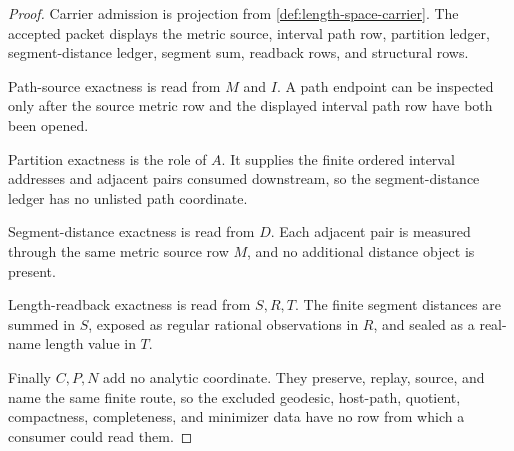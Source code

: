 \begin{proof}
Carrier admission is projection from \autoref{def:length-space-carrier}. The accepted packet displays the metric source, interval path row, partition ledger, segment-distance ledger, segment sum, readback rows, and structural rows.

Path-source exactness is read from $M$ and $I$. A path endpoint can be inspected only after the source metric row and the displayed interval path row have both been opened.

Partition exactness is the role of $A$. It supplies the finite ordered interval addresses and adjacent pairs consumed downstream, so the segment-distance ledger has no unlisted path coordinate.

Segment-distance exactness is read from $D$. Each adjacent pair is measured through the same metric source row $M$, and no additional distance object is present.

Length-readback exactness is read from $S,R,T$. The finite segment distances are summed in $S$, exposed as regular rational observations in $R$, and sealed as a real-name length value in $T$.

Finally $C,P,N$ add no analytic coordinate. They preserve, replay, source, and name the same finite route, so the excluded geodesic, host-path, quotient, compactness, completeness, and minimizer data have no row from which a consumer could read them.
\end{proof}


\begin{closurestatus}{\LengthSpaceUp}
  \theoryclosure{\seedClosure}
  \formalstatus{\unformalizedV}
\end{closurestatus}
